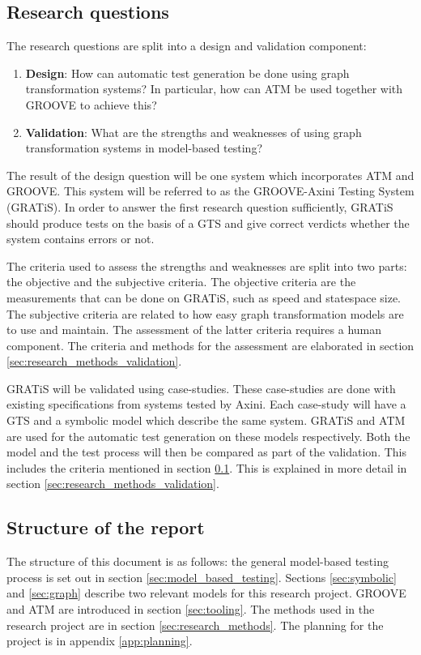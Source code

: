 \subsection{Research questions}\label{sec:questions}
The research questions are split into a design and validation component:
\begin{enumerate}
    \item \textbf{Design}: How can automatic test generation be done using graph transformation systems? In particular, how can ATM be used together with GROOVE to achieve this?
    \item \textbf{Validation}: What are the strengths and weaknesses of using graph transformation systems in model-based testing?
\end{enumerate}

The result of the design question will be one system which incorporates ATM and GROOVE. This system will be referred to as the GROOVE-Axini Testing System (GRATiS). In order to answer the first research question sufficiently, GRATiS should produce tests on the basis of a GTS and give correct verdicts whether the system contains errors or not.

The criteria used to assess the strengths and weaknesses are split into two parts: the objective and the subjective criteria. The objective criteria are the measurements that can be done on GRATiS, such as speed and statespace size. The subjective criteria are related to how easy graph transformation models are to use and maintain. The assessment of the latter criteria requires a human component. The criteria and methods for the assessment are elaborated in section \ref{sec:research_methods_validation}.

GRATiS will be validated using case-studies. These case-studies are done with existing specifications from systems tested by Axini. Each case-study will have a GTS and a symbolic model which describe the same system. GRATiS and ATM are used for the automatic test generation on these models respectively. Both the model and the test process will then be compared as part of the validation. This includes the criteria mentioned in section \ref{sec:questions}. This is explained in more detail in section \ref{sec:research_methods_validation}.

\subsection{Structure of the report}
The structure of this document is as follows: the general model-based testing process is set out in section \ref{sec:model_based_testing}. Sections \ref{sec:symbolic} and \ref{sec:graph} describe two relevant models for this research project. GROOVE and ATM are introduced in section \ref{sec:tooling}. The methods used in the research project are in section \ref{sec:research_methods}. The planning for the project is in appendix \ref{app:planning}.